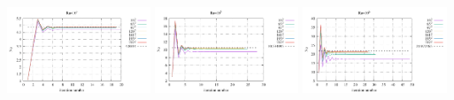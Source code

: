\begin{center}
\includegraphics[width=4.297cm]{python_codes/fieldstone_155/results_SS/Nu_Ra1e4}
\includegraphics[width=4.297cm]{python_codes/fieldstone_155/results_SS/Nu_Ra1e5}
\includegraphics[width=4.297cm]{python_codes/fieldstone_155/results_SS/Nu_Ra1e6}
\end{center}

